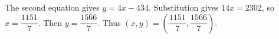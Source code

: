The second equation gives $y=4x-434$. Substitution gives $14x=2302$, so $x=\dfrac{1151}{7}$. Then $y=\dfrac{1566}{7}$. Thus $\boxed{(x,y)=(\dfrac{1151}{7},\dfrac{1566}{7})}$.
